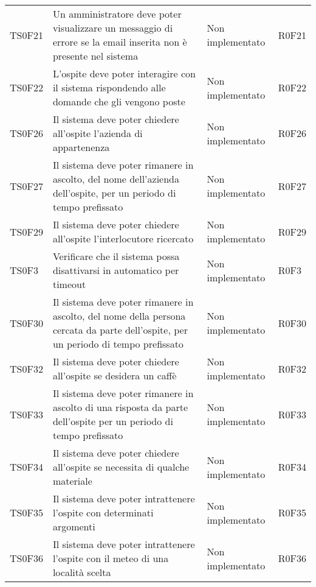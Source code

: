 \documentclass[../PianoDiQualifica.tex]{subfiles}
\begin{document}
\begin{longtable}[c] { >{\centering\arraybackslash}p{2cm} p{7cm} >{\centering\arraybackslash}p{4cm} >{\centering\arraybackslash}p{2cm}}
			\midrule
			\addlinespace[0.3em]
			TS0F21 & Un amministratore deve poter visualizzare un messaggio di errore se la email inserita non è presente nel sistema & Non implementato & R0F21 \\
			\addlinespace[0.3em]
			\midrule
			\addlinespace[0.3em]
			TS0F22 & L'ospite deve poter interagire con il sistema rispondendo alle domande che gli vengono poste & Non implementato & R0F22 \\ 
			\addlinespace[0.3em]
			\midrule
			\addlinespace[0.3em]
			TS0F26 & Il sistema deve poter chiedere all'ospite l'azienda di appartenenza & Non implementato & R0F26 \\ 
			\addlinespace[0.3em]
			\midrule
			\addlinespace[0.3em]
			TS0F27 & Il sistema deve poter rimanere in ascolto, del nome dell'azienda dell'ospite, per un periodo di tempo prefissato	 & Non implementato & R0F27 \\
			\addlinespace[0.3em]
			\midrule
			\addlinespace[0.3em] 
			TS0F29 & Il sistema deve poter chiedere all'ospite l'interlocutore ricercato	 & Non implementato & R0F29 \\ 
			\addlinespace[0.3em]
			\midrule
			\addlinespace[0.3em]
			TS0F3 & Verificare che il sistema possa disattivarsi in automatico per timeout	 & Non implementato & R0F3 \\ 
			\addlinespace[0.3em]
			\midrule
			\addlinespace[0.3em]
			TS0F30 & Il sistema deve poter rimanere in ascolto, del nome della persona cercata da parte dell'ospite, per un periodo di tempo prefissato & Non implementato & R0F30 \\ 
			\addlinespace[0.3em]
			\midrule
			\addlinespace[0.3em]
			TS0F32 & Il sistema deve poter chiedere all'ospite se desidera un caffè & Non implementato & R0F32 \\ 
			\addlinespace[0.3em]
			\midrule
			\addlinespace[0.3em]
			TS0F33 & Il sistema deve poter rimanere in ascolto di una risposta da parte dell'ospite per un periodo di tempo prefissato	 & Non implementato & R0F33 \\ 
			\addlinespace[0.3em]
			\midrule
			\addlinespace[0.3em]
			TS0F34 & Il sistema deve poter chiedere all'ospite se necessita di qualche materiale & Non implementato & R0F34 \\ 
			\addlinespace[0.3em]
			\midrule
			\addlinespace[0.3em]
			TS0F35 & Il sistema deve poter intrattenere l'ospite con determinati argomenti & Non implementato & R0F35 \\ 
			\addlinespace[0.3em]
			\midrule
			\addlinespace[0.3em]
			TS0F36 & Il sistema deve poter intrattenere l'ospite con il meteo di una località  scelta & Non implementato & R0F36 \\ 

\end{longtable}
\end{document}
